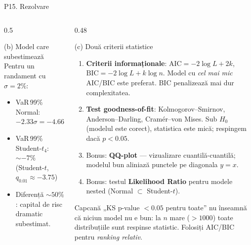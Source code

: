\documentclass[9pt, aspectratio=169, t]{beamer}
\begin{document}
\begin{frame}[shrink=22]{P15. Rezolvare}
\begin{columns}[T]
\begin{column}{0.5\textwidth}
\begin{block}{(b) Model care subestimează}
Pentru un randament cu $\sigma=2\%$:
\begin{itemize}\setlength{\itemsep}{0pt}
\item VaR\,99\% Normal: $-2.33\sigma=-4.66\%$
\item VaR\,99\% Student-$t_4$: $\sim -7\%$ (Student-$t$, $q_{0.01}\approx -3.75$)
\item Diferență $\sim 50\%$: capital de risc dramatic subestimat.
\end{itemize}
\end{block}
\end{column}
\begin{column}{0.48\textwidth}
\begin{block}{(c) Două criterii statistice}
\begin{enumerate}\setlength{\itemsep}{1pt}
\item \textbf{Criterii informaționale}: $\text{AIC} = -2\log L + 2k$, $\text{BIC} = -2\log L + k\log n$. Model cu \emph{cel mai mic} AIC/BIC este preferat. BIC penalizează mai dur complexitatea.
\item \textbf{Test goodness-of-fit}: Kolmogorov--Smirnov, Anderson--Darling, Cramér--von Mises. Sub $H_0$ (modelul este corect), statistica este mică; respingem dacă $p<0.05$.
\item Bonus: \textbf{QQ-plot} --- vizualizare cuantilă-cuantilă; modelul bun aliniază punctele pe diagonala $y=x$.
\item Bonus: testul \textbf{Likelihood Ratio} pentru modele nested (Normal $\subset$ Student-$t$).
\end{enumerate}
\end{block}
\begin{alertblock}{Capcană}
„KS p-value $<0.05$ pentru toate'' nu înseamnă că niciun model nu e bun: la $n$ mare ($>1000$) toate distribuțiile sunt respinse statistic. Folosiți AIC/BIC pentru \emph{ranking relativ}.
\end{alertblock}
\end{column}
\end{columns}
\end{frame}
\end{document}
